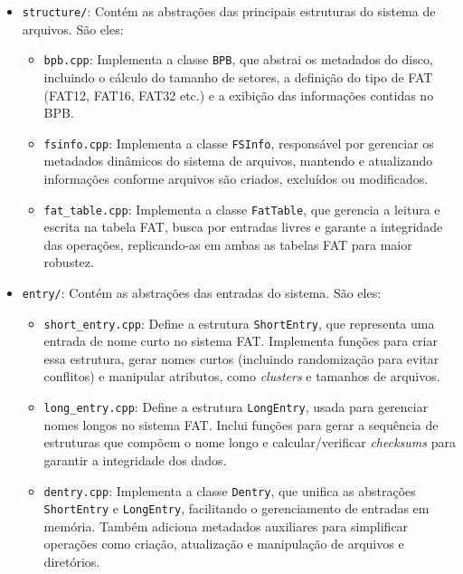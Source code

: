 \documentclass[
    12pt,				%
    oneside,   	        %
    a4paper,			%
    english,			%
    french,				%
    spanish,			%
    brazil,				%
    ]{pacotes/abntex2}
\begin{document}
\begin{itemize}
    \item \texttt{structure/}: Contém as abstrações das principais estruturas do sistema de arquivos. São eles:
    \begin{itemize}
        \item \texttt{bpb.cpp}: Implementa a classe \texttt{BPB}, que abstrai os metadados do disco, incluindo o cálculo do tamanho de setores, a definição do tipo de FAT (FAT12, FAT16, FAT32 etc.) e a exibição das informações contidas no BPB.
        \item \texttt{fsinfo.cpp}: Implementa a classe \texttt{FSInfo}, responsável por gerenciar os metadados dinâmicos do sistema de arquivos, mantendo e atualizando informações conforme arquivos são criados, excluídos ou modificados.
        \item \texttt{fat\_table.cpp}: Implementa a classe \texttt{FatTable}, que gerencia a leitura e escrita na tabela FAT, busca por entradas livres e garante a integridade das operações, replicando-as em ambas as tabelas FAT para maior robustez.
    \end{itemize}

    \item \texttt{entry/}: Contém as abstrações das entradas do sistema. São eles:
    \begin{itemize}
        \item \texttt{short\_entry.cpp}: Define a estrutura \texttt{ShortEntry}, que representa uma entrada de nome curto no sistema FAT. Implementa funções para criar essa estrutura, gerar nomes curtos (incluindo randomização para evitar conflitos) e manipular atributos, como \textit{clusters} e tamanhos de arquivos.
        \item \texttt{long\_entry.cpp}: Define a estrutura \texttt{LongEntry}, usada para gerenciar nomes longos no sistema FAT. Inclui funções para gerar a sequência de estruturas que compõem o nome longo e calcular/verificar \textit{checksums} para garantir a integridade dos dados.
        \item \texttt{dentry.cpp}: Implementa a classe \texttt{Dentry}, que unifica as abstrações \texttt{ShortEntry} e \texttt{LongEntry}, facilitando o gerenciamento de entradas em memória. Também adiciona metadados auxiliares para simplificar operações como criação, atualização e manipulação de arquivos e diretórios.
    \end{itemize}
\end{itemize}
\end{document}
